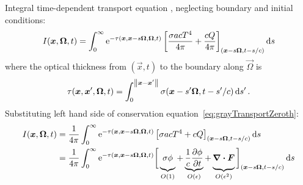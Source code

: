 \documentclass{beamer}
\begin{document}
\begin{frame}
  Integral time-dependent transport equation \cite{Pri2010}, neglecting
  boundary and initial conditions:
  \begin{equation} \label{eq:integralAngularFluxShortened}
    I(\bm{x}, \bm{\Omega}, t)
    = \int_{0}^{\infty}
    \mathop{}\!\mathrm{e}^{ -\tau(\bm{x}, \bm{x} - s \bm{\Omega}, \bm{\Omega}, t)}
    \left[ \frac{\sigma a c T^4}{4\pi} + \frac{c Q}{4\pi} \right]_{(\bm{x} - s
    \bm{\Omega}, t-s/c)} \mathop{}\!\mathrm{d} s
  \end{equation}
  where the optical thickness from $(\vec{x},t)$ to the boundary along
  $\vec{\Omega}$ is
  \begin{equation} \label{eq:integralTrtTauDefinition}
    \tau(\bm{x}, \bm{x}', \bm{\Omega}, t) = \int_{0}^{\left\| \bm{x} -
    \bm{x}' \right\|} \sigma(\bm{x}-s'\bm{\Omega}, t-s'/c) \mathop{}\!\mathrm{d} s' \,.
  \end{equation}
  Substituting left hand side of conservation
  equation~\eqref{eq:grayTransportZeroth}:
  \begin{align}
    I(\bm{x}, \bm{\Omega}, t)
    &= \frac{1}{4\pi} \int_{0}^{\infty}
    \mathop{}\!\mathrm{e}^{ -\tau(\bm{x}, \bm{x} - s \bm{\Omega}, \bm{\Omega}, t)}
    \left[ \sigma a c T^4 + cQ \right]_{(\bm{x} - s \bm{\Omega}, t-s/c)} \mathop{}\!\mathrm{d} s
    \nonumber\\
    &= \frac{1}{4\pi}\int_{0}^{\infty}
    \mathop{}\!\mathrm{e}^{ -\tau(\bm{x}, \bm{x} - s \bm{\Omega}, \bm{\Omega}, t)}
    \bigg[
    \underbrace{\sigma \phi\vphantom{\frac1c}}_{O(1)}
    + \underbrace{\frac{1}{c} \frac{\partial \phi}{\partial t}}_{O(\epsilon)}
    + \underbrace{\bm{\nabla} \bm{\cdot} \bm{F}\vphantom{\frac1c}}_{O(\epsilon^2)}
    \bigg]_{(\bm{x} - s \bm{\Omega}, t-s/c)} \mathop{}\!\mathrm{d} s
    \label{eq:integralTrtRhs}
  \end{align}
\end{frame}
\end{document}
